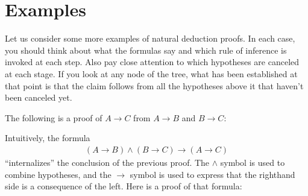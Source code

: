 \documentclass[letterpaper,10pt,english]{sphinxmanual}
\begin{document}
\begin{quote}
\AXM{\bot}
\DP
\quad\quad
\AXM{}
\UIM{\top}
\DP
\end{quote}

\sphinxAtStartPar
{}



\begin{quote}
\AXM{}
\noLine
\UIM{\vdots}
\noLine
{}
\AXM{}
\noLine
\UIM{\vdots}
\noLine
{}
\DP
{}
\DP
\quad\quad
{}
\DP
\end{quote}

\sphinxAtStartPar
{}



\begin{quote}
\AXM{}
\noLine
\UIM{\vdots}
\noLine
\UIM{\bot}
\DP
\end{quote}


\section{Examples}
\label{\detokenize{natural_deduction_for_propositional_logic:examples}}
\sphinxAtStartPar
Let us consider some more examples of natural deduction proofs. In each case, you should think about what the formulas say and which rule of inference is invoked at each step. Also pay close attention to which hypotheses are canceled at each stage. If you look at any node of the tree, what has been established at that point is that the claim follows from all the hypotheses above it that haven’t been canceled yet.

\sphinxAtStartPar
The following is a proof of \(A \to C\) from \(A \to B\) and \(B \to C\):



\begin{center}
\AXM{}
\DP
\end{center}

\sphinxAtStartPar
Intuitively, the formula
\begin{equation*}
\begin{split}(A \to B) \wedge (B \to C) \to (A \to C)\end{split}
\end{equation*}
\sphinxAtStartPar
“internalizes” the conclusion of the previous proof. The \(\wedge\) symbol is used to combine hypotheses, and the \(\to\) symbol is used to express that the right\sphinxhyphen{}hand side is a consequence of the left. Here is a proof of that formula:
\end{document}
